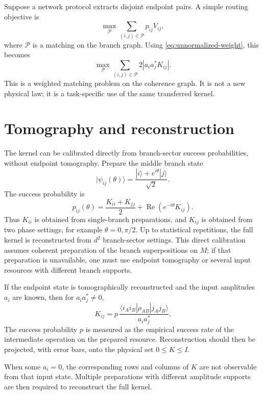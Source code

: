 \documentclass[reprint,aps,pra,superscriptaddress,nofootinbib,longbibliography]{revtex4-2}
\newcommand{\ket}[1]{|#1\rangle}
\newcommand{\bra}[1]{\langle #1|}
\newcommand{\Repart}{\operatorname{Re}}
\begin{document}
Suppose a network protocol extracts disjoint endpoint pairs.  A simple routing objective is
\[
\max_{\mathcal P}
\sum_{(i,j)\in\mathcal P}
p_{ij}V_{ij},
\]
where \(\mathcal P\) is a matching on the branch graph.  Using \eqref{eq:unnormalized-weight}, this becomes
\[
\max_{\mathcal P}
\sum_{(i,j)\in\mathcal P}
2|a_i a_j^*K_{ij}|.
\]
This is a weighted matching problem on the coherence graph.  It is not a new physical law; it is a task-specific use of the same transferred kernel.

\section{Tomography and reconstruction}
\label{sec:tomography}


The kernel can be calibrated directly from branch-sector success probabilities, without endpoint tomography.  Prepare the middle branch state
\[
\ket{\psi_{ij}(\theta)}
=
\frac{\ket{i}+e^{i\theta}\ket{j}}{\sqrt2}.
\]
The success probability is
\begin{equation}
p_{ij}(\theta)
=
\frac{K_{ii}+K_{jj}}2
+
\Repart\!\left(e^{-i\theta}K_{ij}\right).
\label{eq:direct-calibration}
\end{equation}
Thus \(K_{ii}\) is obtained from single-branch preparations, and \(K_{ij}\) is obtained from two phase settings, for example \(\theta=0,\pi/2\).  Up to statistical repetitions, the full kernel is reconstructed from \(d^2\) branch-sector settings.  This direct calibration assumes coherent preparation of the branch superpositions on \(M\); if that preparation is unavailable, one must use endpoint tomography or several input resources with different branch supports.


If the endpoint state is tomographically reconstructed and the input amplitudes \(a_i\) are known, then for \(a_i a_j^*\ne0\),
\begin{equation}
K_{ij}
=
p\,\frac{\bra{i_Ai_B}\rho_{AB}\ket{j_Aj_B}}{a_i a_j^*}.
\label{eq:K-reconstruct}
\end{equation}
The success probability \(p\) is measured as the empirical success rate of the intermediate operation on the prepared resource.  Reconstruction should then be projected, with error bars, onto the physical set \(0\le K\le I\).

When some \(a_i=0\), the corresponding rows and columns of \(K\) are not observable from that input state.  Multiple preparations with different amplitude supports are then required to reconstruct the full kernel.
\end{document}
